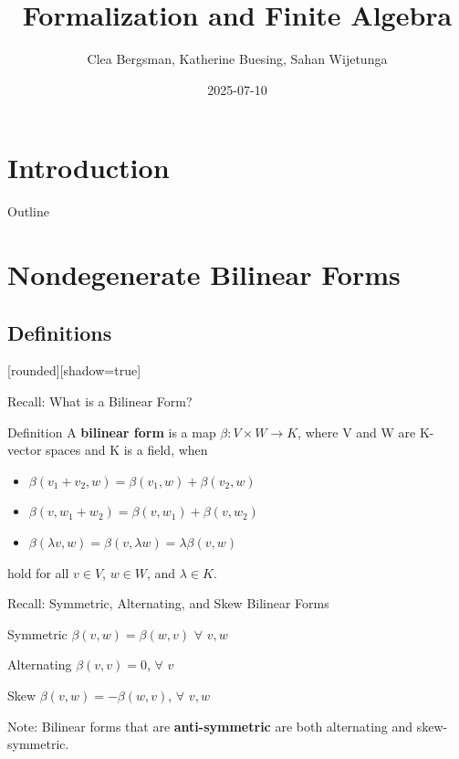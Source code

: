 \documentclass[svgnames]{beamer}
\author{Clea Bergsman, Katherine Buesing, Sahan Wijetunga}
\date{2025-07-10}
\title{Formalization and Finite Algebra}
\begin{document}
\section{Introduction}
\maketitle
\begin{frame}{Outline}
\tableofcontents
\end{frame}

\section {Nondegenerate Bilinear Forms}
\subsection{Definitions}

[rounded][shadow=true]

\begin{frame}{Recall: What is a Bilinear Form?}
\begin{block}{Definition}
A \textbf {bilinear form} is a map $\beta : V\times W \to K $, where V and W are K-vector spaces and K is a field, when
\begin{itemize}
    \item $\beta (v_1 + v_2 , w) = \beta (v_1 , w) +\beta ( v_2,w)$
    \item $\beta ( v, w_1 + w_2) = \beta (v,w_1) +\beta (v , w_2)$
    \item $\beta(\lambda v, w) = \beta (v, \lambda w) = \lambda \beta (v , w)$
\end{itemize}
hold for all $v\in V$, $w\in W$, and $\lambda \in K$.
\end{block}
\end{frame}

\begin{frame}{Recall: Symmetric, Alternating, and Skew Bilinear Forms}

\begin{block}{Symmetric}
$\beta (v,w) = \beta (w,v)$ $\forall$ $v,w$
\end{block}

\begin{block}{Alternating}
$\beta (v,v) = 0$, $\forall$ $v$
\end{block}

\begin{block}{Skew}
$\beta (v,w) = -\beta (w,v)$, $\forall$ $v,w$
\end{block}

Note: Bilinear forms that are \textbf{anti-symmetric} are both alternating and skew-symmetric.
\end{frame}
\end{document}
